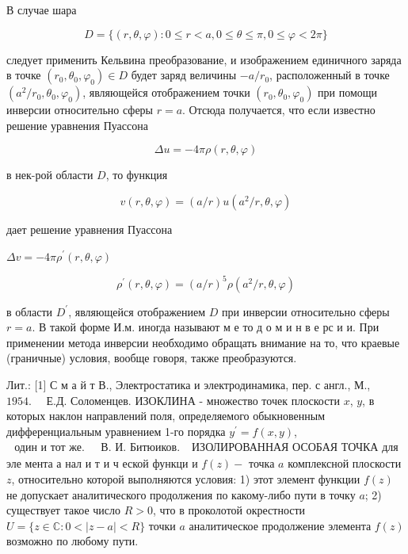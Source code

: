 \documentclass[10pt]{article}
\begin{document}
В случае шара



\[

D=\{(r, \theta, \varphi): 0 \leqslant r<a, 0 \leqslant \theta \leqslant \pi, 0 \leqslant \varphi<2 \pi\}

\]



следует применить Кельвина преобразование, и изображением единичного заряда в точке $\left(r_{0}, \theta_{0}, \varphi_{0}\right) \in D$ будет заряд величины $-a / r_{0}$, расположенный в точке $\left(a^{2} / r_{0}, \theta_{0}, \varphi_{0}\right)$, являющейся отображением точки $\left(r_{0}, \theta_{0}, \varphi_{0}\right)$ при помощи инверсии относительно сферы $r=a$. Отсюда получается, что если известно решение уравнения Пуассона



\[

\Delta u=-4 \pi \rho(r, \theta, \varphi)

\]



в нек-рой области $D$, то функция



\[

v(r, \theta, \varphi)=(a / r) u\left(a^{2} / r, \theta, \varphi\right)

\]



дает решение уравнения Пуассона



$\Delta v=-4 \pi \rho^{\prime}(r, \theta, \varphi)$



\[

\rho^{\prime}(r, \theta, \varphi)=(a / r)^{5} \rho\left(a^{2} / r, \theta, \varphi\right)

\]



в области $D^{\prime}$, являющейся отображением $D$ при инверсии относительно сферы $r=a$. В такой форме И.м. иногда называют м е то д о м и н в е рс и и. При применении метода инверсии необходимо обращать внимание на то, что краевые (граничные) условия, вообще говоря, также преобразуются.



Лит.: [1] С м а й т В., Электростатика и электродинамика, пер. с англ., М., $1954 . \quad$ Е.Д. Соломенцев. ИЗОКЛИНА - множество точек плоскости $x$, $y$, в которых наклон направлений поля, определяемого обыкновенным дифференциальным уравнением 1-го порядка $y^{\prime}=f(x, y)$, $\begin{array}{ll}\text { один и тот же. } & \text { В. И. Битюиков. }\end{array}$ ИЗОЛИРОВАННАЯ ОСОБАЯ ТОЧКА для эле мента а нал и т и ч еской функци и $f(z)-$ точка $a$ комплексной плоскости $z$, относительно которой выполняются условия: 1) этот элемент функции $f(z)$ не допускает аналитического продолжения по какому-либо пути в точку $a$; 2) существует такое число $R>0$, что в проколотой окрестности $U=\{z \in \mathbb{C}: 0<|z-a|<R\}$ точки $a$ аналитическое продолжение элемента $f(z)$ возможно по любому пути.
\end{document}
